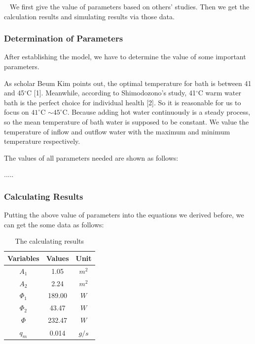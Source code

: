 \documentclass{mcmthesis}
\begin{document}
\quad~ We first give the value of parameters based on others’ studies. Then we get the calculation results and simulating results via those data.

\subsubsection{Determination of Parameters}

After establishing the model, we have to determine the value of some
important parameters.

As scholar Beum Kim points out, the optimal temperature for bath is
between 41 and 45$^\circ$C [1]. Meanwhile, according to Shimodozono's study, 41$^\circ$C warm water bath is the perfect choice for individual health [2]. So it is reasonable for us to focus on $41^\circ$C $\sim 45^\circ$C. Because adding hot water continuously is a steady process, so the mean temperature of bath water is supposed to be constant. We value the temperature of inflow and outflow water with the maximum and minimum temperature respectively.

The values of all parameters needed are shown as follows:

.....

\subsubsection{Calculating Results}

Putting the above value of parameters into the equations we derived before, we can get the some data as follows:

\begin{table}[h]  %
\centering        %
\caption{The calculating results}  %
\vspace{0.15cm}
\label{tab2}                       %
\begin{tabular}{|c|c|c|}  %
\hline                    %
Variables & Values & Unit     \\ \hline  %
$A_1$     & 1.05   &   $m^2$  \\ \hline
$A_2$     & 2.24   &   $m^2$  \\ \hline
$\Phi_1$  & 189.00 &   $W$   \\ \hline
$\Phi_2$  & 43.47  &   $W$   \\ \hline
$\Phi$    & 232.47 &   $W$   \\ \hline
$q_m$     & 0.014  &   $g/s$ \\ \hline
\end{tabular}
\end{table}
\end{document}
